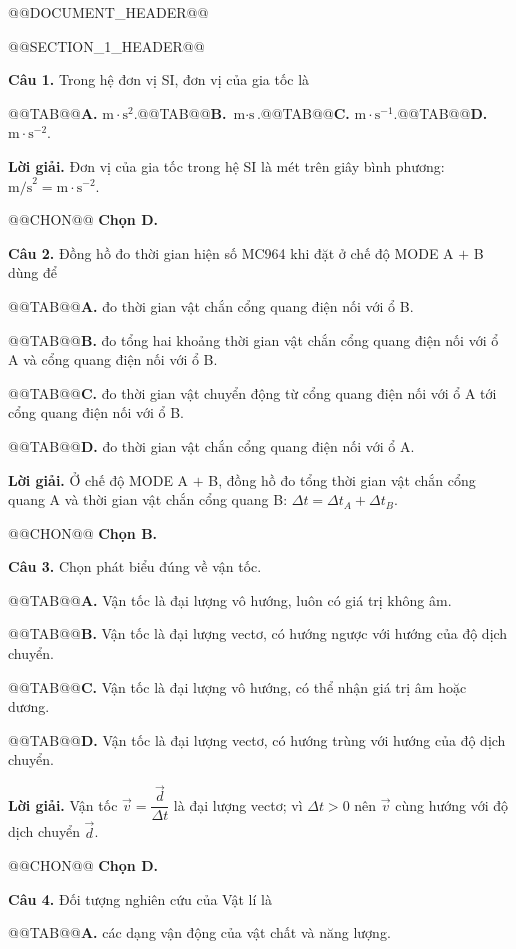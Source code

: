 \documentclass{article}
\begin{document}
@@DOCUMENT_HEADER@@

@@SECTION_1_HEADER@@

\textbf{Câu 1.} Trong hệ đơn vị SI, đơn vị của gia tốc là

@@TAB@@\textbf{A.} $\text{m}\cdot\text{s}^2$.@@TAB@@\textbf{B.} $\text{m}\cdot\text{s}$.@@TAB@@\textbf{C.} $\text{m}\cdot\text{s}^{-1}$.@@TAB@@\textbf{D.} $\text{m}\cdot\text{s}^{-2}$.

\textbf{Lời giải.} Đơn vị của gia tốc trong hệ SI là mét trên giây bình phương: $\text{m/s}^2 = \text{m}\cdot\text{s}^{-2}$.

@@CHON@@ \textbf{Chọn D.}

\textbf{Câu 2.} Đồng hồ đo thời gian hiện số MC964 khi đặt ở chế độ MODE A $+$ B dùng để

@@TAB@@\textbf{A.} đo thời gian vật chắn cổng quang điện nối với ổ B.

@@TAB@@\textbf{B.} đo tổng hai khoảng thời gian vật chắn cổng quang điện nối với ổ A và cổng quang điện nối với ổ B.

@@TAB@@\textbf{C.} đo thời gian vật chuyển động từ cổng quang điện nối với ổ A tới cổng quang điện nối với ổ B.

@@TAB@@\textbf{D.} đo thời gian vật chắn cổng quang điện nối với ổ A.

\textbf{Lời giải.} Ở chế độ MODE A $+$ B, đồng hồ đo tổng thời gian vật chắn cổng quang A và thời gian vật chắn cổng quang B: $\Delta t = \Delta t_A + \Delta t_B$.

@@CHON@@ \textbf{Chọn B.}

\textbf{Câu 3.} Chọn phát biểu đúng về vận tốc.

@@TAB@@\textbf{A.} Vận tốc là đại lượng vô hướng, luôn có giá trị không âm.

@@TAB@@\textbf{B.} Vận tốc là đại lượng vectơ, có hướng ngược với hướng của độ dịch chuyển.

@@TAB@@\textbf{C.} Vận tốc là đại lượng vô hướng, có thể nhận giá trị âm hoặc dương.

@@TAB@@\textbf{D.} Vận tốc là đại lượng vectơ, có hướng trùng với hướng của độ dịch chuyển.

\textbf{Lời giải.} Vận tốc $\vec{v} = \dfrac{\vec{d}}{\Delta t}$ là đại lượng vectơ; vì $\Delta t > 0$ nên $\vec{v}$ cùng hướng với độ dịch chuyển $\vec{d}$.

@@CHON@@ \textbf{Chọn D.}

\textbf{Câu 4.} Đối tượng nghiên cứu của Vật lí là

@@TAB@@\textbf{A.} các dạng vận động của vật chất và năng lượng.
\end{document}
